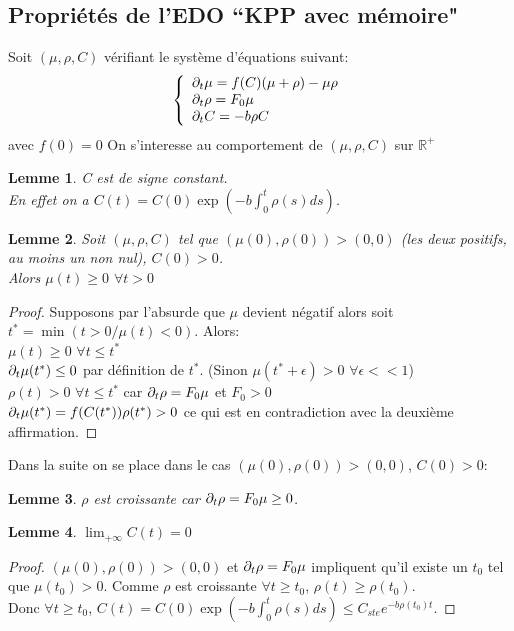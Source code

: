 \subsection{Propriétés de l'EDO ``KPP avec mémoire"}
\newtheorem{lemma}{Lemme}
Soit $(\mu,\rho,C)$ vérifiant le système d’équations suivant:
\begin{equation} \left\{
                \begin{array}{ll}
                   \partial_t\mu  = f(C)(\mu + \rho) -\mu\rho\\
                 \partial_t\rho=  F_0 \mu \\
                  \partial_t C = -b\rho C
                \end{array}
              \right.
\end{equation} avec $f(0)=0$
On s'interesse au comportement de $(\mu,\rho,C)$ sur $\mathbb{R}^+$
\begin{lemma}C est de signe constant.\\
En effet on a $C(t)= C(0)\exp(-b\int_{0}^{t}\rho(s)ds)$.
\end{lemma}

\begin{lemma}Soit $(\mu,\rho,C)$ tel que $(\mu(0),\rho(0))> (0,0)$ (les deux positifs, au moins un non nul), $C(0)>0$.\\  Alors $\mu(t)\geq 0$ $\forall t>0$
\end{lemma}
\begin{proof}
Supposons par l'absurde que $\mu$ devient négatif alors soit $t^*= \min(t>0/ \mu(t)<0)$. Alors: \\
$\mu(t)\geq 0$ $\forall t \leq t^*$\\
$\partial_t\mu(t^*) \leq 0$ par définition de $t^*$. (Sinon $\mu(t^*+\epsilon)>0$ $\forall \epsilon <<1$)\\
$\rho(t)>0$ $\forall t\leq t^*$ car $\partial_t\rho=  F_0 \mu$ et $F_0>0$\\
$\partial_t\mu(t^*) = f(C(t^*))\rho(t^*) > 0$ ce qui est en contradiction avec la deuxième affirmation.
\end{proof}
Dans la suite on se place dans le cas $(\mu(0),\rho(0))> (0,0)$, $C(0)>0$:
\begin{lemma} $\rho$ est croissante car $\partial_t\rho=  F_0 \mu \geq 0$. \end{lemma}



\newpage

\begin{lemma}$\lim_{+\infty}C(t) = 0$ \end{lemma}
\begin{proof} $(\mu(0),\rho(0))> (0,0)$ et $\partial_t\rho=  F_0 \mu$ impliquent qu'il existe un $t_0$ tel que $\mu(t_0)>0$. Comme $\rho$ est croissante $\forall t\geq t_0$, $\rho(t) \geq \rho(t_0)$.\\Donc $\forall t\geq t_0$, $C(t)= C(0)\exp(-b\int_{0}^{t}\rho(s)ds) \leq C_{ste}e^{-b \rho(t_0)t}$.
\end{proof}

